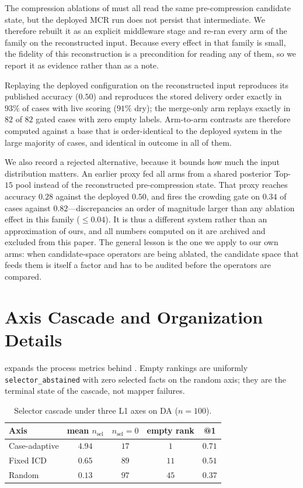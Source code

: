 The compression ablations of  must all read the same pre-compression candidate state, but the deployed MCR run does not persist that intermediate.
We therefore rebuilt it as an explicit middleware stage and re-ran every arm of the family on the reconstructed input.
Because every effect in that family is small, the fidelity of this reconstruction is a precondition for reading any of them, so we report it as evidence rather than as a note.

Replaying the deployed configuration on the reconstructed input reproduces its published accuracy ($0.50$) and reproduces the stored delivery order exactly in $93\%$ of cases with live scoring ($91\%$ dry); the merge-only arm replays exactly in $82$ of $82$ gated cases with zero empty labels.
Arm-to-arm contrasts are therefore computed against a base that is order-identical to the deployed system in the large majority of cases, and identical in outcome in all of them.

We also record a rejected alternative, because it bounds how much the input distribution matters.
An earlier proxy fed all arms from a shared posterior Top-$15$ pool instead of the reconstructed pre-compression state.
That proxy reaches accuracy $0.28$ against the deployed $0.50$, and fires the crowding gate on $0.34$ of cases against $0.82$---discrepancies an order of magnitude larger than any ablation effect in this family ($\le 0.04$).
It is thus a different system rather than an approximation of ours, and all numbers computed on it are archived and excluded from this paper.
The general lesson is the one we apply to our own arms: when candidate-space operators are being ablated, the candidate space that feeds them is itself a factor and has to be audited before the operators are compared.

\section{Axis Cascade and Organization Details}
\label{app:org-axis}

 expands the process metrics behind .
Empty rankings are uniformly \texttt{selector\_abstained} with zero selected facts on the random axis; they are the terminal state of the cascade, not mapper failures.

\begin{table}[t]
\centering
\small
\caption{Selector cascade under three L1 axes on DA ($n{=}100$).}
\label{tab:org-cascade}
\begin{tabular}{lcccc}
\toprule
Axis & mean $n_{\mathrm{sel}}$ & $n_{\mathrm{sel}}{=}0$ & empty rank & @1 \\
\midrule
Case-adaptive & $4.94$ & $17$ & $1$ & $0.71$ \\
Fixed ICD & $0.65$ & $89$ & $11$ & $0.51$ \\
Random & $0.13$ & $97$ & $45$ & $0.37$ \\
\bottomrule
\end{tabular}
\end{table}

